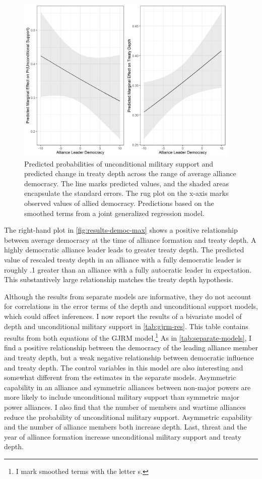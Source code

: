 \documentclass[12pt]{article}
\begin{document}
\begin{figure}[hbtp]
\centering
\includegraphics[width=0.95\textwidth]{../figures/results-democ-max.png}
\caption{Predicted probabilities of unconditional military support and predicted change in treaty depth across the range of average alliance democracy. The line marks predicted values, and the shaded areas encapsulate the standard errors. The rug plot on the x-axis marks observed values of allied democracy. Predictions based on the smoothed terms from a joint generalized regression model.}
\label{fig:results-democ-max}
\end{figure}


The right-hand plot in \autoref{fig:results-democ-max} shows a positive relationship between average democracy at the time of alliance formation and treaty depth.
A highly democratic alliance leader leads to greater treaty depth. 
The predicted value of rescaled treaty depth in an alliance with a fully democratic leader is roughly .1 greater than an alliance with a fully autocratic leader in expectation. 
This substantively large relationship matches the treaty depth hypothesis.


Although the results from separate models are informative, they do not account for correlations in the error terms of the depth and unconditional support models, which could affect inferences. 
I now report the results of a bivariate model of depth and unconditional military support in \autoref{tab:gjrm-res}. 
This table contains results from both equations of the GJRM model.\footnote{I mark smoothed terms with the letter s.}
As in \autoref{tab:separate-models}, I find a positive relationship between the democracy of the leading alliance member and treaty depth, but a weak negative relationship between democratic influence and treaty depth.  
The control variables in this model are also interesting and somewhat different from the estimates in the separate models.  
Asymmetric capability in an alliance and symmetric alliances between non-major powers are more likely to include unconditional military support than symmetric major power alliances. 
I also find that the number of members and wartime alliances reduce the probability of unconditional military support. 
Asymmetric capability and the number of alliance members both increase depth. 
Last, threat and the year of alliance formation increase unconditional military support and treaty depth. 
\end{document}
